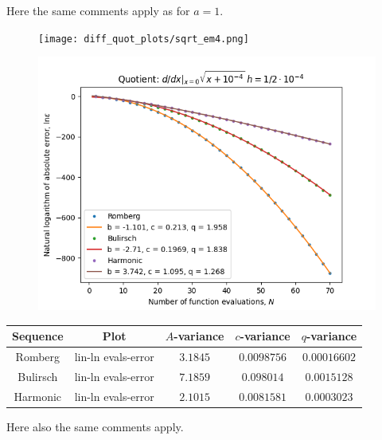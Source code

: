 Here the same comments apply as for \(a = 1\). 

\begin{figure}[H]
\centering
\begin{minipage}{0.45\textwidth}
\centering
\texttt{[image: diff\_quot\_plots/sqrt\_em4.png]}
\end{minipage}
\begin{minipage}{0.45\textwidth}
\centering
\includegraphics[scale=0.45]{diff_quot_plots/sqrt_em4_hp_trend.png}
\end{minipage}
\end{figure}

\begin{table}[H]
    \centering
    \begin{tabular}{c|c||c|c|c}
Sequence & Plot & \(A\)-variance & \(c\)-variance & \(q\)-variance\\\hline
Romberg & lin-ln evals-error & \(3.1845\) & \(0.0098756\) & \(0.00016602\) \\
Bulirsch & lin-ln evals-error & \(7.1859\) & \(0.098014\) & \(0.0015128\) \\
Harmonic & lin-ln evals-error & \(2.1015\) & \(0.0081581\) & \(0.0003023\) \\
    \end{tabular}
    \label{tab:my_label}
\end{table}

Here also the same comments apply.

